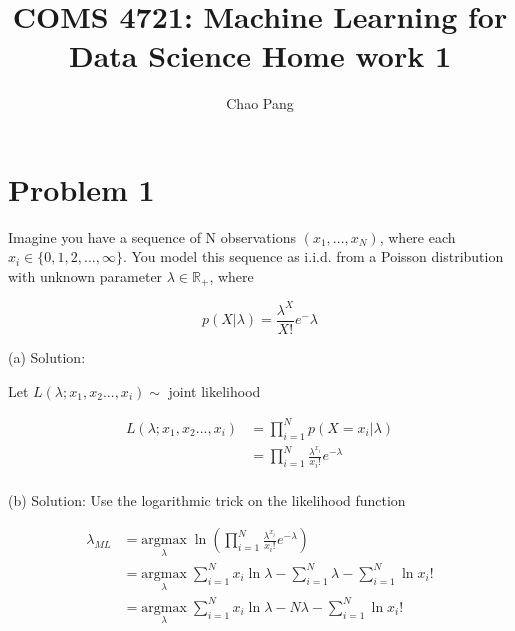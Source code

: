 \documentclass{article}
\begin{document}
\title{COMS 4721: Machine Learning for Data Science 
Home work 1}
\author{Chao Pang}
 
\maketitle

\section{Problem 1}
Imagine you have a sequence of N observations $(x_1,...,x_N)$, where each $x_i \in \{0,1,2,...,\infty\}$. You
model this sequence as i.i.d. from a Poisson distribution with unknown parameter $\lambda \in \mathbb{R}_+$, where

\[ p(X|\lambda) = \frac{ \lambda^X}{X!}e^-\lambda \]

\begin{flushleft}
(a) Solution: 
\end{flushleft}

\begin{center}
Let $L(\lambda; x_1, x_2 ..., x_i)  \sim$ joint likelihood
\end{center}

\begin{equation*}
\begin{split}
L(\lambda; x_1, x_2 ..., x_i)  & = \prod_{i=1}^N p(X=x_i| \lambda) \\
&  = \prod_{i=1}^N\frac{\lambda^{x_i}}{x_i!} e^{-\lambda} \\
\end{split}
\end{equation*}


\begin{flushleft}
(b) Solution: 
Use the logarithmic trick on the likelihood function
\end{flushleft}

\begin{equation*}
\begin{split}
\lambda_{ML} & = \underset{\lambda}{\mathrm{argmax}} \; \ln{(\prod_{i=1}^N\frac{\lambda^{x_i}}{x_i!} e^{-\lambda})} \\
& = \underset{\lambda}{\mathrm{argmax}} \; {\sum_{i=1}^N{x_i}\ln{\lambda} }  - {\sum_{i=1}^N \lambda}  -  {\sum_{i=1}^N\ln{x_i!}}\\
& = \underset{\lambda}{\mathrm{argmax}} \; {\sum_{i=1}^N{x_i}\ln{\lambda} }  - {N\lambda}  -  {\sum_{i=1}^N\ln{x_i!}}\\
\end{split}
\end{equation*}
\end{document}

